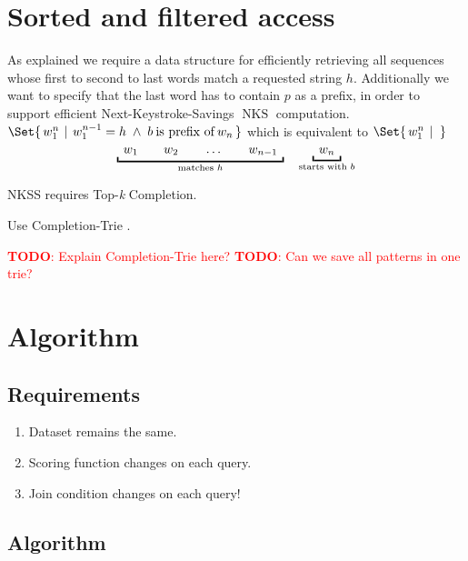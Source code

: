 \documentclass[11pt,a4paper]{report}
\newcommand\givenbase[1][]{\,#1\lvert\,}
\let\given\givenbase
\newcommand{\nksSymbol}{\operatorname{NKS}}
\newcommand{\todo}[1]{\textcolor{red}{\textbf{TODO}: #1}}
\begin{document}
\section{Sorted and filtered access}
\label{sec-sorted-and-filtered-access}

As explained we require a data structure for efficiently retrieving all
sequences whose first to second to last words match a requested string $h$.
Additionally we want to specify that the last word has to contain $p$ as a
prefix, in order to support efficient Next-Keystroke-Savings $\nksSymbol$
computation.
\mbox{$\Set{\, w_1^n \: \given \: w_1^{n-1} = h \; \land \; b \:\text{is prefix of}\: w_n \,}$}
which is equivalent to
\mbox{$\Set{\, w_1^n \: \given \: \,}$}
\begin{equation*}
  \underbracket{\enskip w_1 \qquad w_2 \qquad \ldots \qquad w_{n-1} \enskip}
    _\text{matches $h$}
  \quad
  \underbracket{\enskip w_n \enskip}_\text{starts with $b$}
\end{equation*}


NKSS requires Top-\emph{k} Completion.

Use Completion-Trie \parencite{HsuOttaviano2013}.

\todo{Explain Completion-Trie here?}
\todo{Can we save all patterns in one trie?}

\section{Algorithm}
\label{sec-algorithm}

\subsection{Requirements}

\begin{enumerate}
  \item Dataset remains the same.
  \item Scoring function changes on each query.
  \item Join condition changes on each query!
\end{enumerate}

\subsection{Algorithm}
\end{document}
